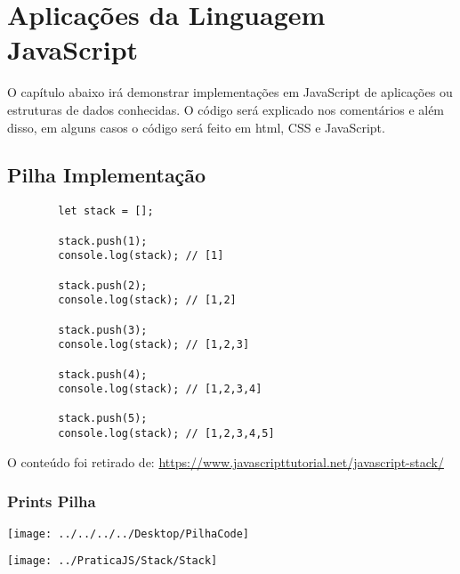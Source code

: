 


\chapter{ Aplica\c{c}\~{o}es da Linguagem JavaScript}

O capítulo abaixo irá demonstrar implementações em JavaScript de aplicações ou estruturas de dados conhecidas. O código será explicado nos comentários e além disso, em alguns casos o código será feito em html, CSS e JavaScript. 


    \section{Pilha Implementação}
    \begin{lstlisting}
    	let stack = [];
    	
    	stack.push(1);
    	console.log(stack); // [1]
    	
    	stack.push(2);
    	console.log(stack); // [1,2]
    	
    	stack.push(3);
    	console.log(stack); // [1,2,3]
    	
    	stack.push(4);
    	console.log(stack); // [1,2,3,4]
    	
    	stack.push(5);
    	console.log(stack); // [1,2,3,4,5]
    \end{lstlisting}
    O conteúdo foi retirado de: \url{https://www.javascripttutorial.net/javascript-stack/}

	\subsection{Prints Pilha}
	
	
	\texttt{[image: ../../../../Desktop/PilhaCode]}
	
	
	\texttt{[image: ../PraticaJS/Stack/Stack]}


